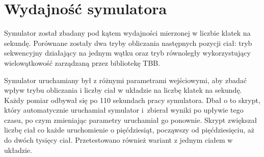 \documentclass[12pt, twoside, openany]{report}
\begin{document}

\section{Wydajność symulatora}
\label{wydajnosc_symulatora}

Symulator został zbadany pod kątem wydajności mierzonej w liczbie klatek na sekundę. Porównane zostały dwa tryby obliczania następnych pozycji ciał: tryb sekwencyjny działający na jednym wątku oraz tryb równoległy wykorzystujący wielowątkowość zarządzaną przez bibliotekę TBB.

Symulator uruchamiany był z różnymi parametrami wejściowymi, aby zbadać wpływ trybu obliczania i liczby ciał w układzie na liczbę klatek na sekundę. Każdy pomiar odbywał się po 110 sekundach pracy symulatora. Dbał o to skrypt, który automatycznie uruchamiał symulator i~zbierał wyniki po upływie tego czasu, po czym zmieniając parametry uruchamiał go ponownie. Skrypt zwiększał liczbę ciał co każde uruchomienie o pięćdziesiąt, począwszy od pięćdziesięciu, aż do dwóch tysięcy ciał. Przetestowano również wariant z jednym ciałem w układzie.
\end{document}
